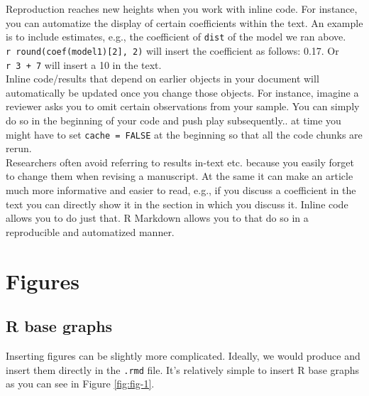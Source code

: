 \documentclass[12pt,]{article}
\newenvironment{Shaded}{\begin{snugshade}}{\end{snugshade}}
\newcommand{\KeywordTok}[1]{\textcolor[rgb]{0.13,0.29,0.53}{\textbf{#1}}}
\newcommand{\OperatorTok}[1]{\textcolor[rgb]{0.81,0.36,0.00}{\textbf{#1}}}
\newcommand{\NormalTok}[1]{#1}
\theoremstyle{definition}
\theoremstyle{definition}
\theoremstyle{definition}
\theoremstyle{remark}
\begin{document}
Reproduction reaches new heights when you work with inline code. For
instance, you can automatize the display of certain coefficients within
the text. An example is to include estimates, e.g., the coefficient of
\texttt{dist} of the model we ran above.
\texttt{\textasciigrave{}r\ round(coef(model1){[}2{]},\ 2)\textasciigrave{}}
will insert the coefficient as follows: 0.17. Or
\texttt{\textasciigrave{}r\ 3\ +\ 7\textasciigrave{}} will insert a 10
in the text.\\
Inline code/results that depend on earlier objects in your document will
automatically be updated once you change those objects. For instance,
imagine a reviewer asks you to omit certain observations from your
sample. You can simply do so in the beginning of your code and push play
subsequently.. at time you might have to set \texttt{cache\ =\ FALSE} at
the beginning so that all the code chunks are rerun.\\
Researchers often avoid referring to results in-text etc. because you
easily forget to change them when revising a manuscript. At the same it
can make an article much more informative and easier to read, e.g., if
you discuss a coefficient in the text you can directly show it in the
section in which you discuss it. Inline code allows you to do just that.
R Markdown allows you to that do so in a reproducible and automatized
manner.

\section{Figures}\label{figures}

\subsection{R base graphs}\label{r-base-graphs}

Inserting figures can be slightly more complicated. Ideally, we would
produce and insert them directly in the \texttt{.rmd} file. It's
relatively simple to insert R base graphs as you can see in Figure
\ref{fig:fig-1}.

\begin{Shaded}
\end{Shaded}
\end{document}
